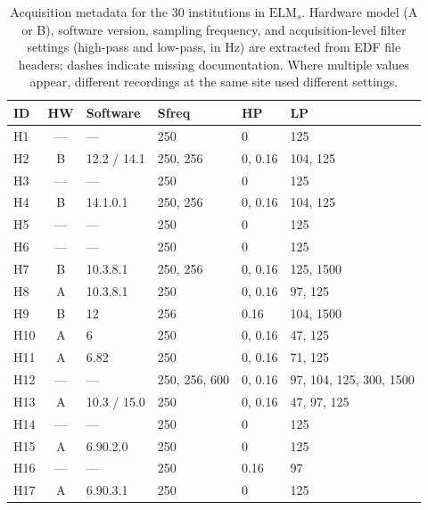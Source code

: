 \documentclass[preprint,12pt]{elsarticle}
\begin{document}
\begin{table}[htbp]
  \centering
  \caption{Acquisition metadata for the 30 institutions in
    $\mathrm{ELM}_s$. Hardware model (A or B), software version,
    sampling frequency, and acquisition-level filter settings
    (high-pass and low-pass, in Hz) are extracted from EDF file
    headers; dashes indicate missing documentation. Where multiple
    values appear, different recordings at the same site used
    different settings.}
  \label{tab:acquisition_metadata}
  \small
  \begin{tabular}{lcllll}
    \toprule
    \textbf{ID} & \textbf{HW} &
    \textbf{Software} & \textbf{Sfreq} &
    \textbf{HP} & \textbf{LP} \\
    \midrule
    H1  & ---  & ---                 & 250       & 0          & 125 \\
    H2  & B    & 12.2 / 14.1        & 250, 256  & 0, 0.16   & 104, 125 \\
    H3  & ---  & ---                 & 250       & 0          & 125 \\
    H4  & B    & 14.1.0.1           & 250, 256  & 0, 0.16   & 104, 125 \\
    H5  & ---  & ---                 & 250       & 0          & 125 \\
    H6  & ---  & ---                 & 250       & 0          & 125 \\
    H7  & B    & 10.3.8.1           & 250, 256  & 0, 0.16   & 125, 1500 \\
    H8  & A    & 10.3.8.1           & 250       & 0, 0.16   & 97, 125 \\
    H9  & B    & 12                  & 256       & 0.16       & 104, 1500 \\
    H10 & A    & 6                   & 250       & 0, 0.16   & 47, 125 \\
    H11 & A    & 6.82                & 250       & 0, 0.16   & 71, 125 \\
    H12 & ---  & ---                 & 250, 256, 600 & 0, 0.16 & 97, 104, 125, 300, 1500 \\
    H13 & A    & 10.3 / 15.0        & 250       & 0, 0.16   & 47, 97, 125 \\
    H14 & ---  & ---                 & 250       & 0          & 125 \\
    H15 & A    & 6.90.2.0            & 250       & 0          & 125 \\
    H16 & ---  & ---                 & 250       & 0.16       & 97 \\
    H17 & A    & 6.90.3.1            & 250       & 0          & 125 \\

\end{tabular}
\end{table}
\end{document}
